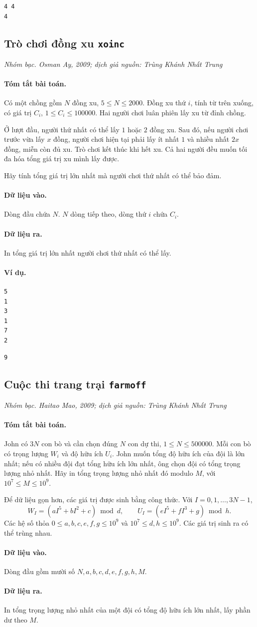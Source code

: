 \documentclass[11pt]{article}
\newcommand{\problem}[4]{%
  \subsection[#1 (#2)]{#1 \hfill {\normalsize\texttt{#2}}}%
  \noindent\textit{#3. #4}\par\smallskip
}
\newcommand{\iosec}[1]{\paragraph{#1}}
\begin{document}
\begin{verbatim}
4 4
4
\end{verbatim}

\problem{Trò chơi đồng xu}{xoinc}{Nhóm bạc}{Osman Ay, 2009; dịch giả nguồn: Trùng Khánh Nhất Trung}

\iosec{Tóm tắt bài toán.}
Có một chồng gồm \(N\) đồng xu, \(5\le N\le 2000\). Đồng xu thứ \(i\), tính
từ trên xuống, có giá trị \(C_i\), \(1\le C_i\le 100000\). Hai người chơi
luân phiên lấy xu từ đỉnh chồng.

Ở lượt đầu, người thứ nhất có thể lấy \(1\) hoặc \(2\) đồng xu. Sau đó, nếu
người chơi trước vừa lấy \(x\) đồng, người chơi hiện tại phải lấy ít nhất
\(1\) và nhiều nhất \(2x\) đồng, miễn còn đủ xu. Trò chơi kết thúc khi hết
xu. Cả hai người đều muốn tối đa hóa tổng giá trị xu mình lấy được.

Hãy tính tổng giá trị lớn nhất mà người chơi thứ nhất có thể bảo đảm.

\iosec{Dữ liệu vào.}
Dòng đầu chứa \(N\). \(N\) dòng tiếp theo, dòng thứ \(i\) chứa \(C_i\).

\iosec{Dữ liệu ra.}
In tổng giá trị lớn nhất người chơi thứ nhất có thể lấy.

\iosec{Ví dụ.}
\begin{verbatim}
5
1
3
1
7
2
\end{verbatim}

\begin{verbatim}
9
\end{verbatim}

\problem{Cuộc thi trang trại}{farmoff}{Nhóm bạc}{Haitao Mao, 2009; dịch giả nguồn: Trùng Khánh Nhất Trung}

\iosec{Tóm tắt bài toán.}
John có \(3N\) con bò và cần chọn đúng \(N\) con dự thi,
\(1\le N\le 500000\). Mỗi con bò có trọng lượng \(W_i\) và độ hữu ích
\(U_i\). John muốn tổng độ hữu ích của đội là lớn nhất; nếu có nhiều đội đạt
tổng hữu ích lớn nhất, ông chọn đội có tổng trọng lượng nhỏ nhất. Hãy in tổng
trọng lượng nhỏ nhất đó modulo \(M\), với \(10^7\le M\le 10^9\).

Để dữ liệu gọn hơn, các giá trị được sinh bằng công thức. Với
\(I=0,1,\ldots,3N-1\),
\[
W_I=(aI^5+bI^2+c)\bmod d,\qquad
U_I=(eI^5+fI^3+g)\bmod h.
\]
Các hệ số thỏa \(0\le a,b,c,e,f,g\le 10^9\) và
\(10^7\le d,h\le 10^9\). Các giá trị sinh ra có thể trùng nhau.

\iosec{Dữ liệu vào.}
Dòng đầu gồm mười số
\(N,a,b,c,d,e,f,g,h,M\).

\iosec{Dữ liệu ra.}
In tổng trọng lượng nhỏ nhất của một đội có tổng độ hữu ích lớn nhất, lấy
phần dư theo \(M\).
\end{document}
